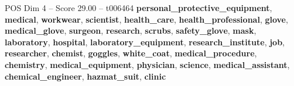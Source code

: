 \begin{textsample}{POS Dim 4 – Score 29.00 – t006464}  \label{ex:f4_pos_026}
\textbf{personal\_protective\_equipment}, \textbf{medical}, \textbf{workwear}, \textbf{scientist}, \textbf{health\_care}, \textbf{health\_professional}, \textbf{glove}, \textbf{medical\_glove}, \textbf{surgeon}, \textbf{research}, \textbf{scrubs}, \textbf{safety\_glove}, \textbf{mask}, \textbf{laboratory}, \textbf{hospital}, \textbf{laboratory\_equipment}, \textbf{research\_institute}, \textbf{job}, \textbf{researcher}, \textbf{chemist}, \textbf{goggles}, \textbf{white\_coat}, \textbf{medical\_procedure}, \textbf{chemistry}, \textbf{medical\_equipment}, \textbf{physician}, \textbf{science}, \textbf{medical\_assistant}, \textbf{chemical\_engineer}, \textbf{hazmat\_suit}, \textbf{clinic}

\end{textsample}
